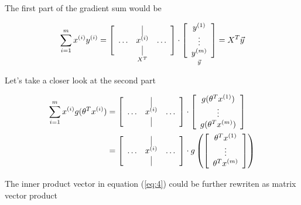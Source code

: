 \documentclass{article}
\begin{document}
The first part of the gradient sum would be

\[
\sum_{i=1}^m   x^{(i)} y^{(i)} = 
\underset{X^T}
{\left[
  \begin{array}{ccc}
     & \vrule & \\
    \ldots & x^{(i)} & \ldots \\
     & \vrule & 
  \end{array}
\right]}
\cdot
\underset{\vec{y}}
{\left[
  \begin{array}{c}
	y^{(1)} \\
	\vdots\\
	y^{(m)}
  \end{array}
\right]}
= X^T \vec{y}
\]

Let's take a closer look at the second part

\begin{align}
\sum_{i=1}^m   x^{(i)}  g({\theta^T}x^{(i)}) &= 
\left[
  \begin{array}{ccc}
     & \vrule & \\
    \ldots & x^{(i)} & \ldots \\
     & \vrule & 
  \end{array}
\right]
\cdot
\left[
  \begin{array}{c}
	g({\theta^T}x^{(1)}) \\
	\vdots\\
	g({\theta^T}x^{(m)})
  \end{array}
\right] \label{eq:3} \\
 &= 
\left[
  \begin{array}{ccc}
     & \vrule & \\
    \ldots & x^{(i)} & \ldots \\
     & \vrule & 
  \end{array}
\right]
\cdot
g\left(
\left[
  \begin{array}{c}
	{\theta^T}x^{(1)} \\
	\vdots\\
	{\theta^T}x^{(m)}
  \end{array}
\right]
\right) \label {eq:4}
\end{align}

The inner product vector in equation ({\ref{eq:4}}) could be further rewriten as matrix vector product
\end{document}
